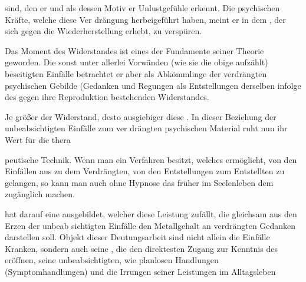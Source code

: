 \documentclass[twoside=true,titlepage=false,open=any, parskip=never, fontsize=10pt, headings=small, chapterprefix=false, appendixprefix=false]{scrbook}
\begin{document}
 sind, den er 
 und als dessen Motiv er
 Unlustgefühle erkennt. Die psychischen Kräfte,
               welche diese Ver
drängung herbeigeführt haben, meint er in dem ,
 der sich gegen die Wiederherstellung erhebt, zu
               verspüren.
        \pend
    



        \pstart
        Das Moment des Widerstandes ist eines der Fundamente seiner
 Theorie geworden.
               Die sonst unter allerlei Vorwänden (wie sie
 die obige  aufzählt) beseitigten Einfälle betrachtet er aber
 als Abkömmlinge der
               verdrängten psychischen Gebilde (Gedanken
 und Regungen als Entstellungen derselben infolge des gegen
 ihre Reproduktion
               bestehenden Widerstandes.
        \pend
    

        \pstart
        Je größer  der Widerstand, desto ausgiebiger diese .
 In dieser Beziehung der unbeabsichtigten Einfälle zum
                  ver
drängten psychischen Material ruht nun ihr Wert für die
                  thera

peutische Technik. Wenn man ein Verfahren besitzt,
               welches
 ermöglicht, von den Einfällen aus zu dem Verdrängten, von den
               Entstellungen zum Entstellten zu gelangen, so kann man auch
 ohne Hypnose das
               früher  im Seelenleben dem
 zugänglich machen.
        \pend
    



        \pstart
        
 hat darauf eine  ausgebildet,
               welcher
 diese Leistung zufällt, die gleichsam aus den Erzen der unbeab
sichtigten Einfälle den Metallgehalt an verdrängten Gedanken
               darstellen soll. Objekt dieser Deutungsarbeit sind nicht allein die
 Einfälle  Kranken, sondern auch seine ,
               die den
 direktesten Zugang zur Kenntnis des  eröffnen, seine
 unbeabsichtigten, wie planlosen Handlungen
               (Symptomhandlungen)
 und die Irrungen seiner Leistungen im Alltagsleben 
\end{document}

